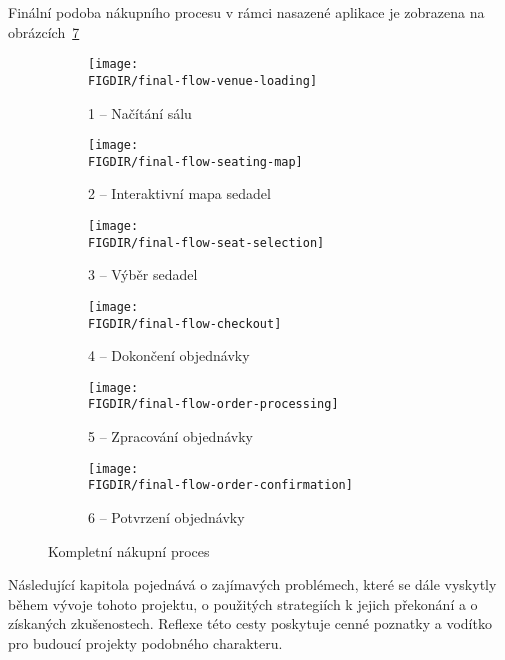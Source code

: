 Finální podoba nákupního procesu v rámci nasazené aplikace je zobrazena na obrázcích~\ref{fig:final-flow}

\begin{figure}[h]
    \centering
    \hfill
    \begin{subfigure}{0.48\textwidth}
        \texttt{[image: \\FIGDIR/final-flow-venue-loading]}
        \caption{1 – Načítání sálu}
        \label{fig:final-flow-venue-loading}
    \end{subfigure}
    \hfill
    \begin{subfigure}{0.48\textwidth}
        \texttt{[image: \\FIGDIR/final-flow-seating-map]}
        \caption{2 – Interaktivní mapa sedadel}
        \label{fig:final-flow-seating-map}
    \end{subfigure}
    \hfill
    \begin{subfigure}{0.48\textwidth}
        \texttt{[image: \\FIGDIR/final-flow-seat-selection]}
        \caption{3 – Výběr sedadel}
        \label{fig:final-flow-seat-selection}
    \end{subfigure}
    \hfill
    \begin{subfigure}{0.48\textwidth}
        \texttt{[image: \\FIGDIR/final-flow-checkout]}
        \caption{4 – Dokončení objednávky}
        \label{fig:final-flow-checkout}
    \end{subfigure}
    \hfill
    \begin{subfigure}{0.48\textwidth}
        \texttt{[image: \\FIGDIR/final-flow-order-processing]}
        \caption{5 – Zpracování objednávky}
        \label{fig:final-flow-order-processing}
    \end{subfigure}
    \hfill
    \begin{subfigure}{0.48\textwidth}
        \texttt{[image: \\FIGDIR/final-flow-order-confirmation]}
        \caption{6 – Potvrzení objednávky}
        \label{fig:final-flow-order-confirmation}
    \end{subfigure}
    \caption{Kompletní nákupní proces}
    \label{fig:final-flow}
\end{figure}

Následující kapitola pojednává o zajímavých problémech, které se dále vyskytly během vývoje tohoto projektu, o použitých strategiích k jejich překonání a o získaných zkušenostech.
Reflexe této cesty poskytuje cenné poznatky a vodítko pro budoucí projekty podobného charakteru.
